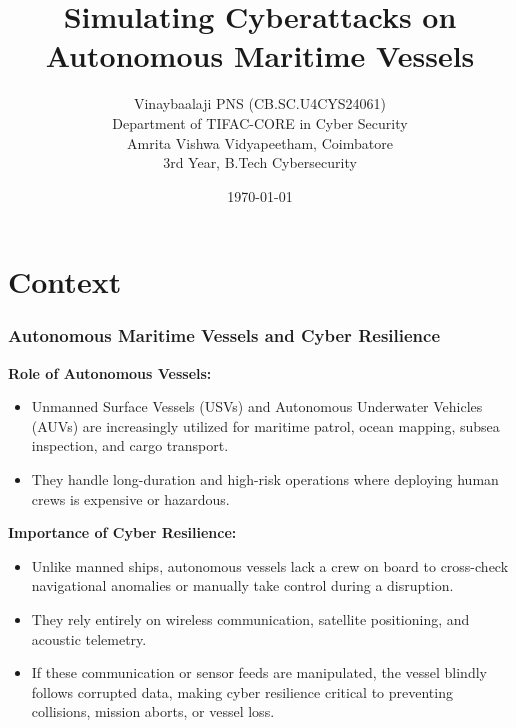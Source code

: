 \documentclass{beamer}
\title[Maritime Cyber Range]{Simulating Cyberattacks on Autonomous Maritime Vessels}
\author{
    Vinaybaalaji PNS \quad (CB.SC.U4CYS24061) \\
    \medskip
    Department of TIFAC-CORE in Cyber Security \\
    Amrita Vishwa Vidyapeetham, Coimbatore \\
    \medskip
    3rd Year, B.Tech Cybersecurity
}
\institute[]{}
\date{\today}
\begin{document}
\begin{frame}
\titlepage
\end{frame}


\section{Context}
\begin{frame}
\frametitle{\textbf{Autonomous Maritime Vessels and Cyber Resilience}}
\textbf{Role of Autonomous Vessels:}
\begin{itemize}
    \item Unmanned Surface Vessels (USVs) and Autonomous Underwater Vehicles (AUVs) are increasingly utilized for maritime patrol, ocean mapping, subsea inspection, and cargo transport.
    \item They handle long-duration and high-risk operations where deploying human crews is expensive or hazardous.
\end{itemize}

\vspace{0.4cm}
\textbf{Importance of Cyber Resilience:}
\begin{itemize}
    \item Unlike manned ships, autonomous vessels lack a crew on board to cross-check navigational anomalies or manually take control during a disruption.
    \item They rely entirely on wireless communication, satellite positioning, and acoustic telemetry.
    \item If these communication or sensor feeds are manipulated, the vessel blindly follows corrupted data, making cyber resilience critical to preventing collisions, mission aborts, or vessel loss.
\end{itemize}
\end{frame}

\end{document}
